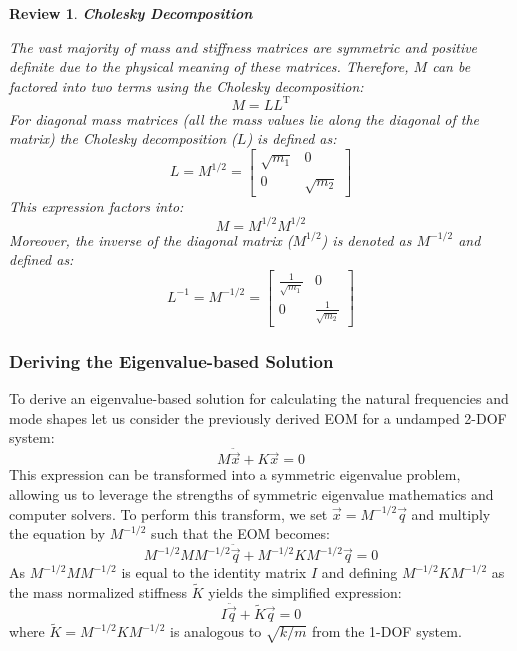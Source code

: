 \documentclass[12pt,letter]{article}
\numberwithin{ex}{section} %
\newtheorem{re}{Review}
\numberwithin{re}{section} %
\newenvironment{review}{\begin{mdframed}[middlelinewidth=2mm,roundcorner=20pt]\begin{re}\normalfont}{\end{re}\end{mdframed}}
\begin{document}
\begin{review}

\textbf{Cholesky Decomposition} 

The vast majority of mass and stiffness matrices are symmetric and positive definite due to the physical meaning of these matrices. Therefore, $M$ can be factored into two terms using the Cholesky decomposition:
\begin{equation}
	M=LL^{\text{T}}
\end{equation}
For diagonal mass matrices (all the mass values lie along the diagonal of the matrix) the Cholesky decomposition ($L$) is defined as:
\begin{equation}
	L = M^{1/2} = \begin{bmatrix} \sqrt{m_1} & 0 \\  0  & \sqrt{m_2} \end{bmatrix} 
\end{equation}
This expression factors into:
\begin{equation}
	M = M^{1/2}M^{1/2}
\end{equation}
Moreover, the inverse of the diagonal matrix ($M^{1/2}$) is denoted as $M^{-1/2}$ and defined as:
\begin{equation}
	L^{-1} = M^{-1/2} = \begin{bmatrix} \frac{1}{\sqrt{m_1}} & 0 \\  0  & \frac{1}{\sqrt{m_2}} \end{bmatrix} 
\end{equation}
\end{review}


\subsubsection{Deriving the Eigenvalue-based Solution}
 
To derive an eigenvalue-based solution for calculating the natural frequencies and mode shapes let us consider the previously derived EOM for a undamped 2-DOF system:
\begin{equation}
M\ddot{\vec{x}} + K\vec{x} =0
\end{equation}
This expression can be transformed into a symmetric eigenvalue problem, allowing us to leverage the strengths of symmetric eigenvalue mathematics and computer solvers. To perform this transform, we set $\vec{x}=M^{-1/2}\vec{q}$ and multiply the equation by $M^{-1/2}$ such that the EOM becomes:
\begin{equation}
M^{-1/2}MM^{-1/2}\ddot{\vec{q}} + M^{-1/2}KM^{-1/2}\vec{q} =0
\end{equation}
As $M^{-1/2}MM^{-1/2}$ is equal to the identity matrix $I$ and defining $M^{-1/2}KM^{-1/2}$ as the mass normalized stiffness $\widetilde{K}$ yields the simplified expression:
\begin{equation}
I\ddot{\vec{q}} + \widetilde{K}\vec{q} =0
\end{equation}
where $\widetilde{K}=M^{-1/2}KM^{-1/2}$ is analogous to $\sqrt{k/m}$ from the 1-DOF system. 
\end{document}
